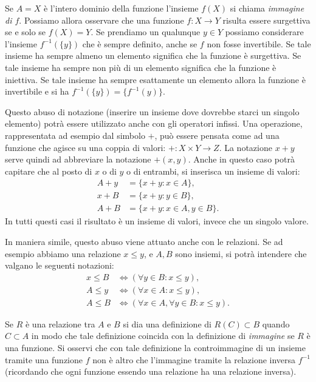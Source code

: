 \documentclass[italian,a4paper,hidelinks,headinclude]{scrartcl}
\begin{document}
Se $A=X$ è l'intero dominio della funzione
l'insieme $f(X)$ si chiama \emph{immagine di $f$}.
Possiamo allora osservare che una funzione $f\colon X \to Y$ risulta essere
surgettiva se e solo se $f(X) = Y$.
Se prendiamo un qualunque $y\in Y$ possiamo considerare l'insieme $f^{-1}(\{y\})$
che è sempre definito, anche se $f$ non fosse invertibile. Se tale insieme ha sempre
almeno un elemento significa che la funzione è surgettiva. Se tale insieme ha
sempre non più di un elemento significa che la funzione è iniettiva.
Se tale insieme ha sempre esattamente un elemento allora la funzione è invertibile
e si ha $f^{-1}(\{y\}) = \{f^{-1}(y)\}$.

Questo abuso di notazione
(inserire un insieme dove dovrebbe starci un singolo elemento)
potrà essere utilizzato anche con gli operatori infissi.
Una operazione, rappresentata ad esempio dal simbolo $+$, può essere pensata
come ad una funzione che agisce su una coppia di valori: $+\colon X\times Y \to Z$.
La notazione $x+y$ serve quindi ad abbreviare la notazione $+(x,y)$.
Anche in questo caso potrà capitare che al posto di $x$ o di $y$ o di entrambi,
si inserisca un insieme di valori:
\begin{align*}
   A + y &= \{x+y\colon x \in A\}, \\
   x + B &= \{x+y\colon y \in B\}, \\
   A + B &= \{x+y\colon x\in A, y \in B\}.
\end{align*}
In tutti questi casi il risultato è un insieme di valori, invece che un singolo
valore.

In maniera simile, questo abuso viene attuato anche con le relazioni.
Se ad esempio abbiamo
una relazione $x\le y$, e $A, B$ sono insiemi, si potrà intendere
che valgano le seguenti notazioni:
\begin{align*}
  x \le B &\iff (\forall y\in B\colon x\le y), \\
  A \le y &\iff (\forall x\in A\colon x \le y), \\
  A \le B &\iff (\forall x\in A, \forall y\in B\colon x\le y).
\end{align*}

\begin{exercise}
Se $R$ è una relazione tra $A$ e $B$ si dia una definizione di $R(C)\subset B$
quando $C\subset A$ in modo che tale definizione coincida con la definizione
di \emph{immagine} se $R$ è una funzione.
Si osservi che con tale definizione la controimmagine di un insieme tramite
una funzione $f$ non è altro che l'immagine tramite la relazione inversa $f^{-1}$
(ricordando che ogni funzione essendo una relazione ha una relazione inversa).
\end{exercise}
\end{document}

